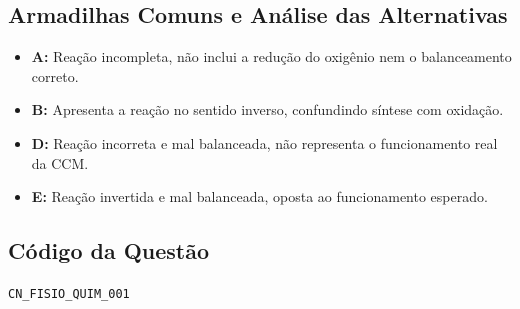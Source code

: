 \documentclass{article}
\begin{document}
\subsection*{Armadilhas Comuns e Análise das Alternativas}
\begin{itemize}
\item \textbf{A:} Reação incompleta, não inclui a redução do oxigênio nem o balanceamento correto.
\item \textbf{B:} Apresenta a reação no sentido inverso, confundindo síntese com oxidação.
\item \textbf{D:} Reação incorreta e mal balanceada, não representa o funcionamento real da CCM.
\item \textbf{E:} Reação invertida e mal balanceada, oposta ao funcionamento esperado.
\end{itemize}

\subsection*{Código da Questão}
\texttt{CN\_FISIO\_QUIM\_001}

\end{document}
